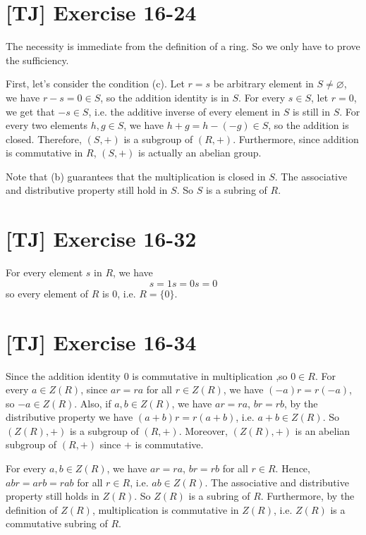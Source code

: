 \documentclass[a4paper,11pt,twocolumn]{article}
\begin{document}
  \section{[TJ] Exercise 16-24}
  The necessity is immediate from the definition of a ring. So we only have to prove the sufficiency. \par
  First, let's consider the condition (c). Let $r = s$ be arbitrary element in $S \neq \varnothing$, we have $r - s = 0 \in S$, so the addition identity is in $S$. For every $s \in S$, let $r = 0$, we get that $-s \in S$, i.e. the additive inverse of every element in $S$ is still in $S$. For every two elements $h, g \in S$, we have $ h + g = h - (-g) \in S$, so the addition is closed. Therefore, $(S, +)$ is a subgroup of $(R, +)$. Furthermore, since addition is commutative in $R$, $(S, +)$ is actually an abelian group. \par
  Note that (b) guarantees that the multiplication is closed in $S$. The associative and distributive property still hold in $S$. So $S$ is a subring of $R$.

  \section{[TJ] Exercise 16-32}
  For every element $s$ in $R$, we have 
  $$ s = 1s = 0s = 0 $$
  so every element of $R$ is 0, i.e. $R = \{0\}$.
  
  \section{[TJ] Exercise 16-34}
  Since the addition identity 0 is commutative in multiplication ,so $0 \in R$. For every $a \in Z(R)$, since $ar = ra$ for all $r \in Z(R)$, we have $(-a)r = r(-a)$, so $-a \in Z(R)$. Also, if $a, b \in Z(R)$, we have $ar = ra$, $br = rb$, by the distributive property we have $(a+b)r = r(a+b)$, i.e. $a+b \in Z(R)$. So $(Z(R), +)$ is a subgroup of $(R, +)$. Moreover, $(Z(R), +)$ is an abelian subgroup of $(R, +)$ since + is commutative. \par
  For every $a, b \in Z(R)$, we have $ar = ra$, $br = rb$ for all $r \in R$. Hence, $abr = arb = rab$ for all $r \in R$, i.e. $ab \in Z(R)$. The associative and distributive property still holds in $Z(R)$. So $Z(R)$ is a subring of $R$. Furthermore, by the definition of $Z(R)$, multiplication is commutative in $Z(R)$, i.e. $Z(R)$ is a commutative subring of $R$.
\end{document}
